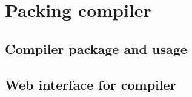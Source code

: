 \section{Packing compiler}

\subsection{Compiler package and usage}

\subsection{Web interface for compiler}